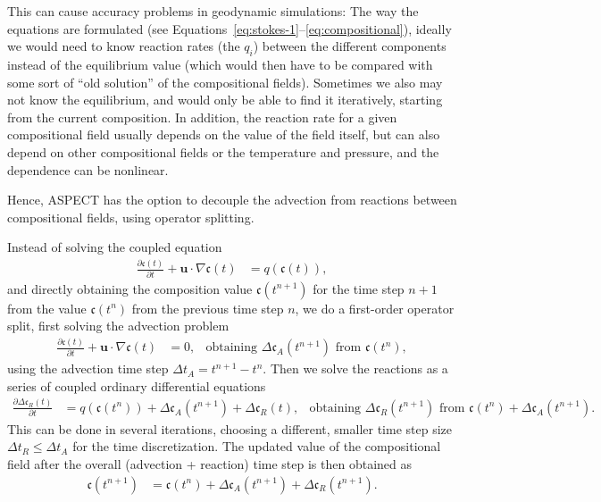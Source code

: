 \documentclass{article}
\newcommand{\aspect}{\textsc{ASPECT}}
\begin{document}
This can cause accuracy problems in geodynamic simulations: The way the equations are formulated (see Equations~\ref{eq:stokes-1}--\ref{eq:compositional}), ideally we would need to know reaction rates (the $q_i$) between the different components instead of the equilibrium value (which would then have to be compared with some sort of ``old solution'' of the compositional fields). Sometimes we also may not know the equilibrium, and would only be able to find it iteratively, starting from the current composition. In addition, the reaction rate for a given compositional field usually depends on the value of the field itself, but can also depend on other compositional fields or the temperature and pressure, and the dependence can be nonlinear.

Hence, \aspect{} has the option to decouple the advection from reactions between compositional fields, using operator splitting.

Instead of solving the coupled equation
\begin{align}
  \frac{\partial \mathfrak{c}(t)}{\partial t} + \mathbf u\cdot\nabla \mathfrak{c}(t)
  &=
  q(\mathfrak{c}(t)),
\end{align}
and directly obtaining the composition value $\mathfrak{c}(t^{n+1})$ for the time step $n+1$ from the value $\mathfrak{c}(t^{n})$ from the previous time step $n$, we do a first-order operator split, first solving the advection problem
\begin{align}
  \frac{\partial \mathfrak{c}(t)}{\partial t} + \mathbf u\cdot\nabla \mathfrak{c}(t)
  &=
  0,
  &
  \text{obtaining } \Delta \mathfrak{c}_A(t^{n+1}) \text{ from } \mathfrak{c}(t^{n}),
\end{align}
using the advection time step $\Delta t_A = t^{n+1} - t^{n}$.
Then we solve the reactions as a series of coupled ordinary differential equations
\begin{align}
  \frac{\partial \Delta \mathfrak{c}_R(t)}{\partial t}
  &=
  q(\mathfrak{c}(t^n))+\Delta \mathfrak{c}_A(t^{n+1})+\Delta \mathfrak{c}_R(t),
  &
  \text{obtaining } \Delta \mathfrak{c}_R(t^{n+1}) \text{ from } \mathfrak{c}(t^n)+\Delta \mathfrak{c}_A(t^{n+1}).
\end{align}
This can be done in several iterations, choosing a different, smaller time step size $\Delta t_R \leq \Delta t_A$ for the time discretization.
The updated value of the compositional field after the overall (advection + reaction) time step is then obtained as
\begin{align}
  \mathfrak{c}(t^{n+1})
  &=
  \mathfrak{c}(t^{n}) + \Delta \mathfrak{c}_A(t^{n+1})+\Delta \mathfrak{c}_R(t^{n+1}).
\end{align}
\end{document}

